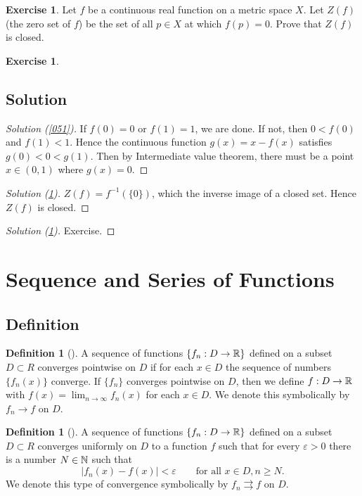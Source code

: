 \documentclass[	DIV=calc,paper=a4,fontsize=11pt]{scrartcl}	 	%
\theoremstyle{definition}
\newtheorem{defn}[thm]{Definition}
\newtheorem{exer}[thm]{Exercise}
\theoremstyle{plain}
\theoremstyle{remark}
\begin{document}
\begin{exer}\label{052}
Let $f$ be a continuous real function on a metric space $X$. Let $Z(f)$ (the zero set of $f$) be the set of all $p\in X$ at which $f(p)= 0$. Prove that $Z(f)$ is closed.
\end{exer}

\begin{exer}\label{053}
\end{exer}


\newpage
\subsection*{Solution}
\begin{proof}[Solution (\ref{051})]
If $f(0)=0$ or $f(1)=1$, we are done. If not, then $0<f(0)$ and $f(1)<1$. Hence the continuous function $g(x)=x-f(x)$ satisfies $g(0)<0<g(1)$. Then by Intermediate value theorem, there must be a point $x\in (0,1)$ where $g(x)=0$.
\end{proof}
\begin{proof}[Solution (\ref{052})]
$Z(f)=f^{-1}(\{0\})$, which the inverse image of a closed set. Hence $Z(f)$ is closed.
\end{proof}
\begin{proof}[Solution (\ref{053})]
Exercise.
\end{proof}
\newpage

\section{Sequence and Series of Functions}


\subsection{Definition}

\begin{defn}[\textbf{\color{blue}{Pointwise convergence}}]
A sequence of functions $\{f_n : D \to \Bbb R\}$ defined on a subset $D\subset R$ converges pointwise on $D$ if for each $x\in D$ the sequence of numbers $\{f_n(x)\}$ converge. If $\{f_n\}$ converges pointwise on $D$, then we define $f : D\to \Bbb R$ with $f(x) = \lim_{n\to\infty}f_n(x)$ for each $x\in D$. We denote this symbolically by $f_n\to f$ on $D$.
\end{defn}

\begin{defn}[\textbf{\color{blue}{Uniform convergence}}]
A sequence of functions $\{f_n : D \to \Bbb R\}$ defined on a subset $D\subset R$ converges uniformly on $D$ to a function $f$ such that for every $\varepsilon> 0$ there is a number $N\in \Bbb N$ such that
$$|f_n(x)-f(x)| < \varepsilon \qquad \text{for all } x \in D, n \geq N.$$
We denote this type of convergence symbolically by $f_n\rightrightarrows f$ on $D$.
\end{defn}
\end{document}
